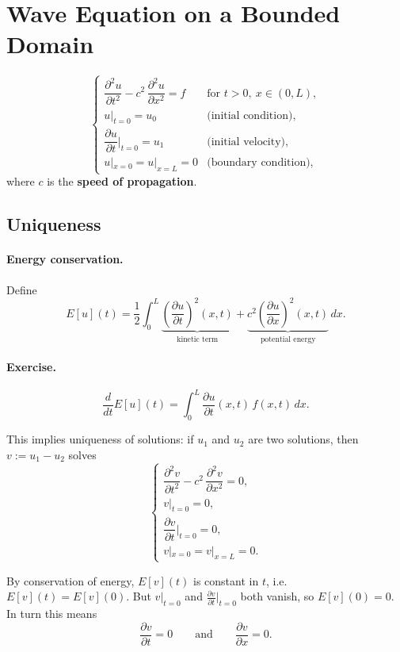 \section{Wave Equation on a Bounded Domain}

\[
\begin{cases}
\dfrac{\partial^2 u}{\partial t^2} - c^2\,\dfrac{\partial^2 u}{\partial x^2} = f & \text{for } t > 0,\ x \in (0, L), \\[2pt]
u|_{t=0} = u_0 & \text{(initial condition),} \\[2pt]
\dfrac{\partial u}{\partial t}\Big|_{t=0} = u_1 & \text{(initial velocity),} \\[2pt]
u|_{x=0} = u|_{x=L} = 0 & \text{(boundary condition),}
\end{cases}
\]
where $c$ is the \textbf{speed of propagation}.

\subsection{Uniqueness}

\paragraph{Energy conservation.}
Define
\[
E[u](t) = \frac{1}{2}\int_0^L \underbrace{\left(\frac{\partial u}{\partial t}\right)^2(x, t)}_{\text{kinetic term}} + \underbrace{c^2\left(\frac{\partial u}{\partial x}\right)^2(x, t)}_{\text{potential energy}}\,dx.
\]

\paragraph{Exercise.}
\[
\frac{d}{dt}E[u](t) = \int_0^L \frac{\partial u}{\partial t}(x, t)\,f(x, t)\,dx.
\]

This implies uniqueness of solutions: if $u_1$ and $u_2$ are two solutions, then $v := u_1 - u_2$ solves
\[
\begin{cases}
\dfrac{\partial^2 v}{\partial t^2} - c^2\,\dfrac{\partial^2 v}{\partial x^2} = 0, \\[2pt]
v|_{t=0} = 0, \\[2pt]
\dfrac{\partial v}{\partial t}\Big|_{t=0} = 0, \\[2pt]
v|_{x=0} = v|_{x=L} = 0.
\end{cases}
\]

By conservation of energy, $E[v](t)$ is constant in $t$, i.e.\ $E[v](t) = E[v](0)$. But $v|_{t=0}$ and $\frac{\partial v}{\partial t}|_{t=0}$ both vanish, so $E[v](0) = 0$. In turn this means
\[
\frac{\partial v}{\partial t} = 0 \qquad \text{and} \qquad \frac{\partial v}{\partial x} = 0.
\]

